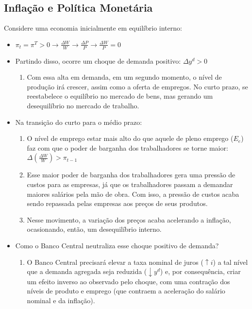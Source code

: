 \documentclass[a4paper,12pt]{article}[abntex2]
\begin{document}
\subsection{\textbf{Inflação e Política Monetária}}

Considere uma economia inicialmente em equilíbrio interno:\begin{itemize}
    \item $\pi_t=\pi^T>0\rightarrow\frac{\Delta W}{W}\rightarrow\frac{\Delta P}{P}\rightarrow\frac{\Delta W}{P}=0$
    \item Partindo disso, ocorre um choque de demanda positivo: $\Delta y^d>0$\begin{enumerate}
        \item Com essa alta em demanda, em um segundo momento, o nível de produção irá crescer, assim como a oferta de empregos. No curto prazo, se reestabelece o equilíbrio no mercado de bens, mas gerando um desequilíbrio no mercado de trabalho.  
    \end{enumerate}
    \item Na transição do curto para o médio prazo: \begin{enumerate}
        \item O nível de emprego estar mais alto do que aquele de pleno emprego ($E_e$) faz com que o poder de barganha dos trabalhadores se torne maior: $\Delta (\frac{\Delta W}{W})>\pi_{t-1}$
        \item Esse maior poder de barganha dos trabalhadores gera uma pressão de custos para as empresas, já que os trabalhadores passam a demandar maiores salários pela mão de obra. Com isso, a pressão de custos acaba sendo repassada pelas empresas aos preços de seus produtos. 
        \item Nesse movimento, a variação dos preços acaba acelerando a inflação, ocasionando, então, um desequilíbrio interno.
    \end{enumerate}
    \item Como o Banco Central neutraliza esse choque positivo de demanda? \begin{enumerate}
        \item O Banco Central precisará elevar a taxa nominal de juros ($\uparrow i$) a tal nível que a demanda agregada seja reduzida ($\downarrow y^d$) e, por consequência, criar um efeito inverso ao observado pelo choque, com uma contração dos níveis de produto e emprego (que contraem a aceleração do salário nominal e da inflação). 
        \begin{figure}[H]
            \centering

\end{figure}
\end{enumerate}
\end{itemize}
\end{document}
